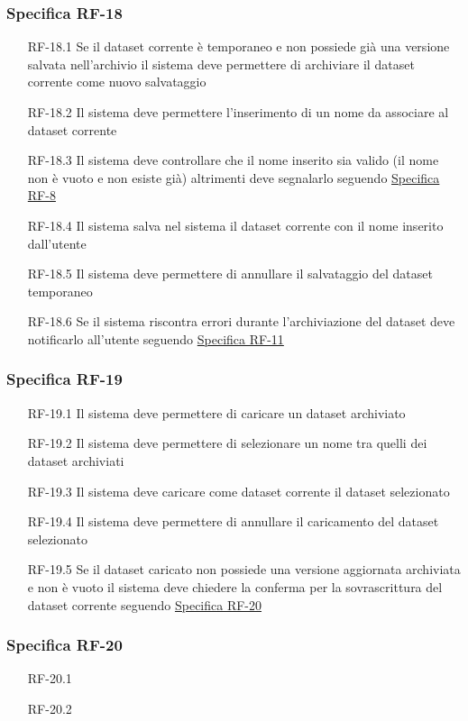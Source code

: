 \subsubsection{Specifica RF-18}
\label{subsubsec:RF-18}
\begin{enumerate}
    \item[RF-18.1] Se il dataset corrente è temporaneo e non possiede già una versione salvata nell'archivio il sistema deve permettere di archiviare il dataset corrente come nuovo salvataggio
    \item[RF-18.2] Il sistema deve permettere l'inserimento di un nome da associare al dataset corrente 
    \item[RF-18.3] Il sistema deve controllare che il nome inserito sia valido (il nome non è vuoto e non esiste già) altrimenti deve segnalarlo seguendo \hyperref[subsubsec:RF-8]{Specifica RF-8}
    \item[RF-18.4] Il sistema salva nel sistema il dataset corrente con il nome inserito dall'utente
    \item[RF-18.5] Il sistema deve permettere di annullare il salvataggio del dataset temporaneo
    \item[RF-18.6] Se il sistema riscontra errori durante l'archiviazione del dataset deve notificarlo all'utente seguendo \hyperref[subsubsec:RF-11]{Specifica RF-11}
\end{enumerate}

\subsubsection{Specifica RF-19}
\label{subsubsec:RF-19}
\begin{enumerate}
    \item[RF-19.1] Il sistema deve permettere di caricare un dataset archiviato
    \item[RF-19.2] Il sistema deve permettere di selezionare un nome tra quelli dei dataset archiviati
    \item[RF-19.3] Il sistema deve caricare come dataset corrente il dataset selezionato
    \item[RF-19.4] Il sistema deve permettere di annullare il caricamento del dataset selezionato
    \item[RF-19.5] Se il dataset caricato non possiede una versione aggiornata archiviata e non è vuoto il sistema deve chiedere
    la conferma per la sovrascrittura del dataset corrente seguendo \hyperref[subsubsec:RF-20]{Specifica RF-20}
\end{enumerate}

\subsubsection{Specifica RF-20}
\label{subsubsec:RF-20}
\begin{enumerate}
    \item[RF-20.1] 
    \item[RF-20.2] 
\end{enumerate}




